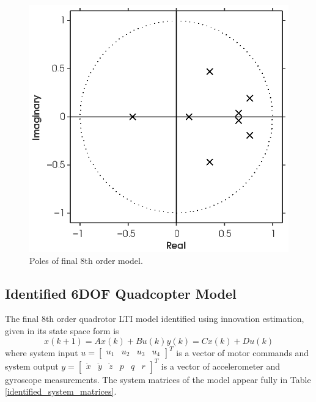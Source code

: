 \begin{figure}[htb!]
	\centering
	\includegraphics{../fig/poles_1760.eps}
	\caption{Poles of final 8th order model.}
	\label{fig:poles_1760}
\end{figure}


\subsection{Identified 6DOF Quadcopter Model}
The final 8th order quadrotor LTI model identified using innovation estimation, given in its state space form is 
\begin{subequations}\label{eq:2_lti}
\begin{equation*}x(k+1) = Ax(k) + Bu(k)\end{equation*}
\begin{equation*}y(k) = Cx(k) + Du(k)\end{equation*}
\end{subequations}
where system input $u = \begin{bmatrix}u_1 & u_2 & u_3 & u_4\end{bmatrix}^T$ is a vector of motor commands and system output $y = \begin{bmatrix}\ddot x & \ddot y & \ddot z & p & q & r\end{bmatrix}^T$ is a vector of accelerometer and gyroscope measurements. The system matrices of the model appear fully in Table \ref{identified_system_matrices}.

